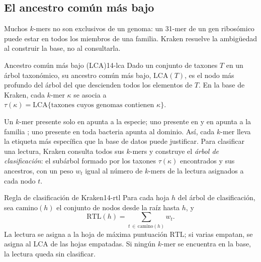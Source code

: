 \subsection{El ancestro común más bajo}

Muchos $k$-mers no son exclusivos de un genoma: un 31-mer de un gen ribosómico puede estar en todos los miembros de una familia. Kraken resuelve la ambigüedad al construir la base, no al consultarla.

\begin{definicion}{Ancestro común más bajo (LCA)}{14-lca}
Dado un conjunto de taxones $T$ en un árbol taxonómico, su ancestro común más bajo, $\mathrm{LCA}(T)$, es el nodo más profundo del árbol del que descienden todos los elementos de $T$. En la base de Kraken, cada $k$-mer $\kappa$ se asocia a $\tau(\kappa) = \mathrm{LCA}\{\text{taxones cuyos genomas contienen } \kappa\}$.
\end{definicion}

Un $k$-mer presente solo en  apunta a la especie; uno presente en  y en  apunta a la familia ; uno presente en toda bacteria apunta al dominio. Así, cada $k$-mer lleva la etiqueta más específica que la base de datos puede justificar. Para clasificar una lectura, Kraken consulta todos sus $k$-mers y construye el \emph{árbol de clasificación}: el subárbol formado por los taxones $\tau(\kappa)$ encontrados y sus ancestros, con un peso $w_t$ igual al número de $k$-mers de la lectura asignados a cada nodo $t$.

\begin{teorema}{Regla de clasificación de Kraken}{14-rtl}
Para cada hoja $h$ del árbol de clasificación, sea $\mathrm{camino}(h)$ el conjunto de nodos desde la raíz hasta $h$, y
\begin{equation}\label{eq:14-rtl}
\mathrm{RTL}(h) = \sum_{t\,\in\,\mathrm{camino}(h)} w_t .
\end{equation}
La lectura se asigna a la hoja de máxima puntuación $\mathrm{RTL}$; si varias empatan, se asigna al LCA de las hojas empatadas. Si ningún $k$-mer se encuentra en la base, la lectura queda sin clasificar.
\end{teorema}

\begin{simbolos}
\end{simbolos}

